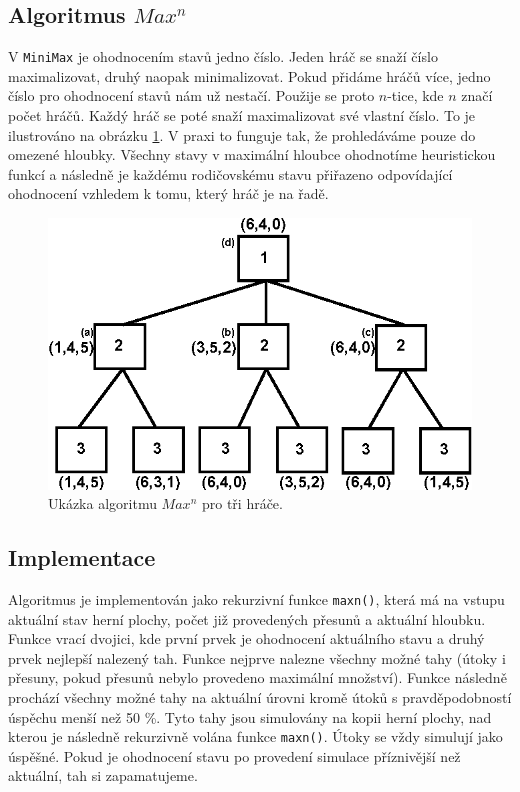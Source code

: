 \documentclass[a4paper,11pt]{article}
\begin{document}
	\subsection{Algoritmus \texttt{$Max^n$}}
		V \texttt{MiniMax} je ohodnocením stavů jedno číslo. Jeden hráč se snaží číslo maximalizovat, druhý naopak minimalizovat. Pokud přidáme hráčů více, jedno číslo pro ohodnocení stavů nám už nestačí. Použije se proto $n$-tice, kde $n$ značí počet hráčů. Každý hráč se poté snaží maximalizovat své vlastní číslo. To je ilustrováno na obrázku \ref{fig:maxn}. V praxi to funguje tak, že prohledáváme pouze do omezené hloubky. Všechny stavy v maximální hloubce ohodnotíme heuristickou funkcí a následně je každému rodičovskému stavu přiřazeno odpovídající ohodnocení vzhledem k tomu, který hráč je na řadě.
		
		\begin{figure}[h]
			\label{fig:maxn}
			\centering
			\includegraphics[scale=0.5]{maxn.png}
			\caption{Ukázka algoritmu \texttt{$Max^n$} pro tři hráče.}
		\end{figure}
		
	\subsection{Implementace}
		Algoritmus je implementován jako rekurzivní funkce \texttt{maxn()}, která má na vstupu aktuální stav herní plochy, počet již provedených přesunů a aktuální hloubku. Funkce vrací dvojici, kde první prvek je ohodnocení aktuálního stavu a druhý prvek nejlepší nalezený tah. Funkce nejprve nalezne všechny možné tahy (útoky i přesuny, pokud přesunů nebylo provedeno maximální množství). Funkce následně prochází všechny možné tahy na aktuální úrovni kromě útoků s pravděpodobností úspěchu menší než 50 \%. Tyto tahy jsou simulovány na kopii herní plochy, nad kterou je následně rekurzivně volána funkce \texttt{maxn()}. Útoky se vždy simulují jako úspěšné.
		Pokud je ohodnocení stavu po provedení simulace příznivější než aktuální, tah si zapamatujeme.
		
\end{document}
